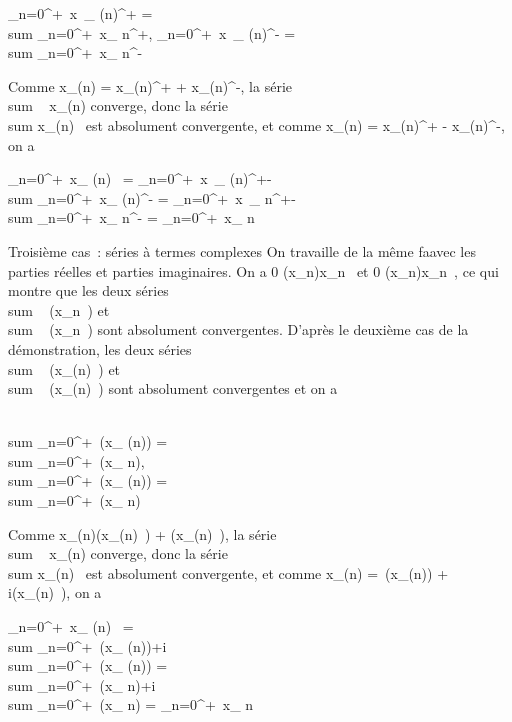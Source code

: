 \documentclass[]{article}
\begin{document}
\sum \_n=0^+\infty~x~\_
\sigma(n)^+ = \\sum
\_n=0^+\infty~x\_ n^+,\quad
\sum \_n=0^+\infty~x~\_
\sigma(n)^- = \\sum
\_n=0^+\infty~x\_ n^-

Comme \textbar{}x\_\sigma(n)\textbar{} = x\_\sigma(n)^+ +
x\_\sigma(n)^-, la série
\\sum ~
\textbar{}x\_\sigma(n)\textbar{} converge, donc la série
\\sum  x\_\sigma(n)~
est absolument convergente, et comme x\_\sigma(n) =
x\_\sigma(n)^+ - x\_\sigma(n)^-, on a

\sum \_n=0^+\infty~x\_ \sigma(n)~ =
\sum \_n=0^+\infty~x~\_
\sigma(n)^+-\\sum
\_n=0^+\infty~x\_ \sigma(n)^- =
\sum \_n=0^+\infty~x~\_
n^+-\\sum
\_n=0^+\infty~x\_ n^- =
\sum \_n=0^+\infty~x\_ n~

Troisième cas~: séries à termes complexes On travaille de la même
fa\ccon avec les parties réelles et parties
imaginaires. On a 0
\leq\textbar{}\mathrmRe(x\_n)\textbar{}\leq\textbar{}x\_n~\textbar{}
et 0
\leq\textbar{}\mathrmIm(x\_n)\textbar{}\leq\textbar{}x\_n~\textbar{},
ce qui montre que les deux séries
\\sum ~
\mathrmRe(x\_n~) et
\\sum ~
\mathrmIm(x\_n~)
sont absolument convergentes. D'après le deuxième cas de la
démonstration, les deux séries
\\sum ~
\mathrmRe(x\_\sigma(n)~)
et \\sum ~
\mathrmIm(x\_\sigma(n)~)
sont absolument convergentes et on a

\\sum
\_n=0^+\infty~\mathrmRe(x\_ \sigma(n))
= \\sum
\_n=0^+\infty~\mathrmRe(x\_
n),\quad \\sum
\_n=0^+\infty~\mathrmIm(x\_ \sigma(n))
= \\sum
\_n=0^+\infty~\mathrmIm(x\_ n)

Comme
\textbar{}x\_\sigma(n)\textbar{}\leq\textbar{}\mathrmRe(x\_\sigma(n)~)\textbar{}
+
\textbar{}\mathrmIm(x\_\sigma(n)~)\textbar{},
la série \\sum ~
\textbar{}x\_\sigma(n)\textbar{} converge, donc la série
\\sum  x\_\sigma(n)~
est absolument convergente, et comme x\_\sigma(n)
=\
\mathrmRe(x\_\sigma(n)) +
i\mathrmRe(x\_\sigma(n)~),
on a

\sum \_n=0^+\infty~x\_ \sigma(n)~ =
\\sum
\_n=0^+\infty~\mathrmRe(x\_
\sigma(n))+i\\sum
\_n=0^+\infty~\mathrmRe(x\_ \sigma(n))
= \\sum
\_n=0^+\infty~\mathrmRe(x\_
n)+i\\sum
\_n=0^+\infty~\mathrmIm(x\_ n) =
\sum \_n=0^+\infty~x\_ n~
\end{document}
